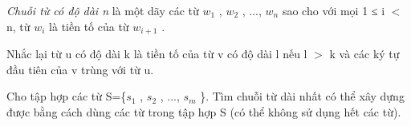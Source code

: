 \textit{    Chuỗi từ có độ dài n   }   là một dãy các từ $w_{1}$   , $w_{2}$   , ..., $w_{n}$   sao cho với mọi 1 ≤ i $<$ n, từ $w_{i}$   là tiền tố của từ $w_{i+1}$   .  

   Nhắc lại từ u có độ dài k là tiền tố của từ v có độ dài l nếu l $>$ k và các ký tự đầu tiên của v trùng với từ u.  

   Cho tập hợp các từ S=\{$s_{1}$   , $s_{2}$   , ..., $s_{m}$   \}. Tìm chuỗi từ dài nhất có thể xây dựng  được bằng cách dùng các từ trong tập hợp S (có thể không sử dụng hết các từ).